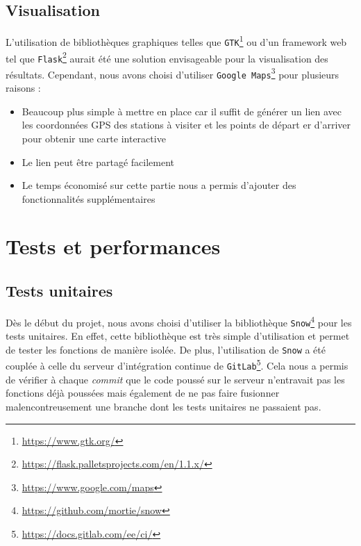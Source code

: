 \documentclass[a4paper, 12pt]{report}
\begin{document}
\subsection{Visualisation}
L'utilisation de bibliothèques graphiques telles que \texttt{GTK}\footnote{\url{https://www.gtk.org/}} ou d'un framework web tel que \texttt{Flask}\footnote{\url{https://flask.palletsprojects.com/en/1.1.x/}} aurait été une solution envisageable pour la visualisation des résultats. Cependant, nous avons choisi d'utiliser \texttt{Google Maps}\footnote{\url{https://www.google.com/maps}} pour plusieurs raisons :
\begin{itemize}
    \item Beaucoup plus simple à mettre en place car il suffit de générer un lien avec les coordonnées GPS des stations à visiter et les points de départ er d'arriver pour obtenir une carte interactive
    \item Le lien peut être partagé facilement
    \item Le temps économisé sur cette partie nous a permis d'ajouter des fonctionnalités supplémentaires
\end{itemize}
\clearpage
\section{Tests et performances}
\subsection{Tests unitaires}
Dès le début du projet, nous avons choisi d'utiliser la bibliothèque \texttt{Snow}\footnote{\url{https://github.com/mortie/snow}} pour les tests unitaires. En effet, cette bibliothèque est très simple d'utilisation et permet de tester les fonctions de  manière isolée. De plus, l'utilisation de \texttt{Snow} a été couplée à celle du serveur d'intégration continue de \texttt{GitLab}\footnote{\url{https://docs.gitlab.com/ee/ci/}}. Cela nous a permis de vérifier à chaque \textit{commit} que le code poussé sur le serveur n'entravait pas les fonctions déjà poussées mais également de ne pas faire fusionner malencontreusement une branche dont les tests unitaires ne passaient pas.\par\bigskip
\end{document}
